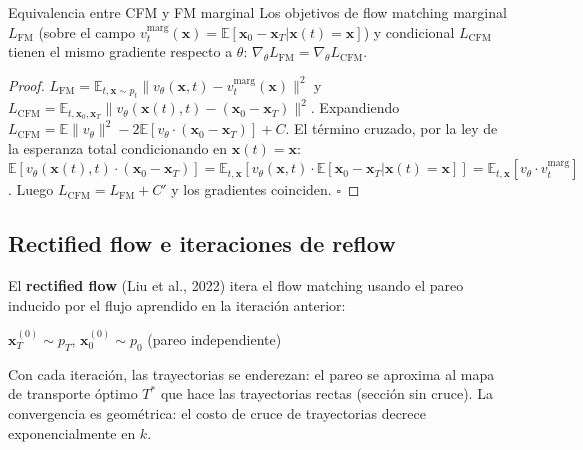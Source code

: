 \begin{proposicion}{Equivalencia entre CFM y FM marginal}
\label{prop:cfm_fm}
Los objetivos de flow matching marginal $L_{\mathrm{FM}}$ (sobre el campo
$v_t^{\mathrm{marg}}(\bm{x}) = \mathbb{E}[\bm{x}_0-\bm{x}_T|\bm{x}(t)=\bm{x}]$)
y condicional $L_{\mathrm{CFM}}$ tienen el mismo gradiente respecto a $\theta$:
$\nabla_\theta L_{\mathrm{FM}} = \nabla_\theta L_{\mathrm{CFM}}$.
\end{proposicion}

\begin{proof}
$L_{\mathrm{FM}} = \mathbb{E}_{t,\bm{x}\sim p_t}\|v_\theta(\bm{x},t) -
v_t^{\mathrm{marg}}(\bm{x})\|^2$ y $L_{\mathrm{CFM}} = \mathbb{E}_{t,\bm{x}_0,\bm{x}_T}
\|v_\theta(\bm{x}(t),t) - (\bm{x}_0-\bm{x}_T)\|^2$.
Expandiendo $L_{\mathrm{CFM}} = \mathbb{E}\|v_\theta\|^2 - 2\mathbb{E}[v_\theta\cdot
(\bm{x}_0-\bm{x}_T)] + C$.
El término cruzado, por la ley de la esperanza total condicionando en
$\bm{x}(t) = \bm{x}$:
$\mathbb{E}[v_\theta(\bm{x}(t),t)\cdot(\bm{x}_0-\bm{x}_T)]
= \mathbb{E}_{t,\bm{x}}\left[v_\theta(\bm{x},t)\cdot\mathbb{E}[\bm{x}_0-\bm{x}_T|
\bm{x}(t)=\bm{x}]\right]
= \mathbb{E}_{t,\bm{x}}[v_\theta\cdot v_t^{\mathrm{marg}}]$.
Luego $L_{\mathrm{CFM}} = L_{\mathrm{FM}} + C'$ y los gradientes coinciden.
$\square$
\end{proof}

\subsection{Rectified flow e iteraciones de reflow}
\label{subsec:rectified_flow}

El \textbf{rectified flow} (Liu et al., 2022) itera el flow matching usando el
pareo inducido por el flujo aprendido en la iteración anterior:

\begin{algorithm}[H]
\caption{Rectified flow con $k$ iteraciones de reflow}
\label{alg:rectified_flow}
$\bm{x}_T^{(0)} \sim p_T$, $\bm{x}_0^{(0)} \sim p_0$ (pareo independiente)\;
\end{algorithm}

Con cada iteración, las trayectorias se enderezan: el pareo se aproxima al
mapa de transporte óptimo $T^*$ que hace las trayectorias rectas (sección sin
cruce). La convergencia es geométrica: el costo de cruce de trayectorias
decrece exponencialmente en $k$.


